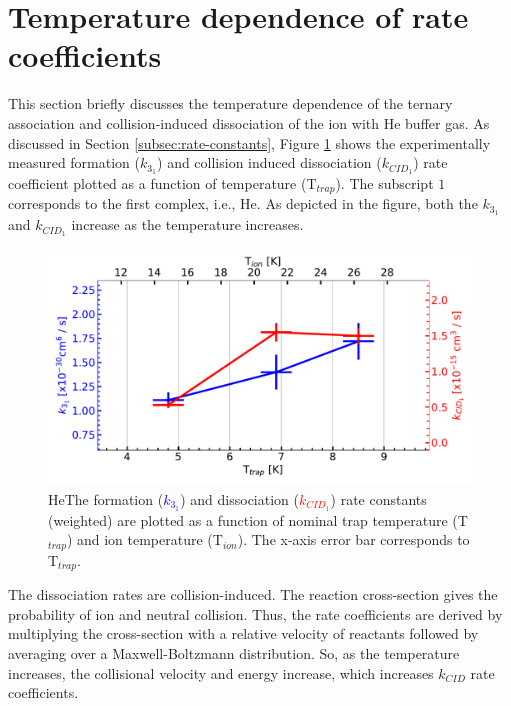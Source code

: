 \section{Temperature dependence of rate coefficients}
\label{subsec:temp-dependence}

This section briefly discusses the temperature dependence of the ternary
association and collision-induced dissociation of the \CD ion with He buffer gas.
As discussed in Section \ref{subsec:rate-constants}, Figure
\ref{fig:off:rate-constants:f(t)} shows the experimentally measured formation
($k_{3_1}$) and collision induced dissociation ($k_{CID_1}$) rate coefficient plotted
as a function of temperature (T$_{trap}$). The subscript $1$ corresponds to the
first complex, i.e., He\CD. As depicted in the figure, both the $k_{3_1}$ and
$k_{CID_1}$ increase as the temperature increases.

\begin{figure}[!htb]
    \centering
    \includegraphics[width=1\textwidth]{figures/measurements/kinetics/functionOf_T/off_k3_kCID_as_functionOfT_with_Tcol.pdf}
    \caption{He\CD The formation (\textcolor{blue}{$k_{3_1}$}) and dissociation (\textcolor{red}{$k_{CID_1}$}) rate constants (weighted) are plotted as a function of nominal trap temperature (T$_{trap}$) and ion temperature (T$_{ion}$). The x-axis error bar corresponds to T$_{trap}$. }
    \label{fig:off:rate-constants:f(t)}
\end{figure}

The dissociation rates are collision-induced. The reaction cross-section gives
the probability of ion and neutral collision. Thus, the rate coefficients are
derived by multiplying the cross-section with a relative velocity of reactants
followed by averaging over a Maxwell-Boltzmann distribution. So, as the
temperature increases, the collisional velocity and energy increase, which
increases $k_{CID}$ rate coefficients.\\

